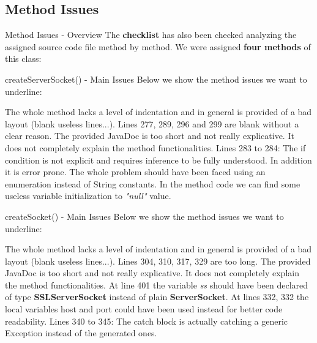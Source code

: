 \documentclass{../common/latex_classes/pdf_presentation}
\newcommand{\renderPartialCode}[2]{}
\begin{document}
	\subsection{Method Issues}
	
	\begin{frame}{Method Issues - Overview}
		The \textbf{checklist} has also been checked analyzing the assigned source code file method by method.
		We were assigned \textbf{four methods} of this class:
		\configureJava{}
		\renderPartialCode{275}{276}
		\renderPartialCode{310}{310}
		\renderPartialCode{368}{369}
		\renderPartialCode{438}{438}
	\end{frame}
	
	\begin{frame}{createServerSocket() - Main Issues}
		Below we show the method issues we want to underline:
		\begin{itemize}
			 The whole method 	lacks a level of indentation and in general is provided of a bad layout (blank useless lines...).
			 Lines 277, 289, 296 and 299 are blank without a clear reason.
			 The provided JavaDoc is too short and not really explicative. It does not completely explain the method functionalities.
			 Lines 283 to 284: The if condition is not explicit and requires inference to be fully understood. In addition it is error prone. The whole problem should have been faced using an enumeration instead of String constants.
			 In the method code we can find some useless variable initialization to \textit{"null"} value.
		\end{itemize}
	\end{frame}
	
	\begin{frame}{createSocket() - Main Issues}
		Below we show the method issues we want to underline:
		\begin{itemize}
			 The whole method 	lacks a level of indentation and in general is provided of a bad layout (blank useless lines...).
			 Lines 304, 310, 317, 329 are too long.
			 The provided JavaDoc is too short and not really explicative. It does not completely explain the method functionalities.
			 At line 401 the variable \textit{ss} should have been declared of type \textbf{SSLServerSocket} instead of plain \textbf{ServerSocket}.
			 At lines 332, 332 the local variables host and port could have been used instead for better code readability.
			 Lines 340 to 345: The catch block is actually catching a generic Exception instead of the generated ones.
		\end{itemize}
	\end{frame}
	
\end{document}
